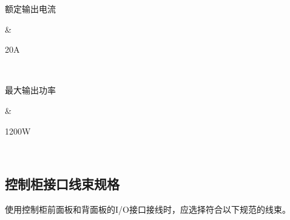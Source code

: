 \documentclass[a4paper,11pt,english,openany,oneside]{sphinxmanual}
\begin{document}
\begin{savenotes}
\begin{tabular}[t]{}
\sphinxhline\begin{varwidth}[t]{}
\sphinxAtStartPar
额定输出电流
\sphinxbeforeendvarwidth
\end{varwidth}%
&\begin{varwidth}[t]{}
\sphinxAtStartPar
20A
\sphinxbeforeendvarwidth
\end{varwidth}%
\\
\sphinxhline\begin{varwidth}[t]{}
\sphinxAtStartPar
最大输出功率
\sphinxbeforeendvarwidth
\end{varwidth}%
&\begin{varwidth}[t]{}
\sphinxAtStartPar
1200W
\sphinxbeforeendvarwidth
\end{varwidth}%
\\
\sphinxbottomrule
\end{tabular}
\sphinxtableafterendhook\par
\sphinxattableend\end{savenotes}


\subsection{控制柜接口线束规格}
\label{\detokenize{07 _u6280_u672f_u89c4_u683c:id9}}\label{\detokenize{07 _u6280_u672f_u89c4_u683c:id10}}
\sphinxAtStartPar
使用控制柜前面板和背面板的I/O接口接线时，应选择符合以下规范的线束。
\end{document}
